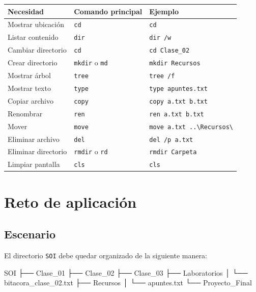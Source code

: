 \documentclass[
  spanish,
  letterpaper,
]{scrbook}
\newenvironment{Shaded}{\begin{snugshade}}{\end{snugshade}}
\newcommand{\NormalTok}[1]{\textcolor[rgb]{0.00,0.23,0.31}{#1}}
\newcounter{none} %
\begin{document}
{\def\LTcaptype{none} %
\begin{longtable}[]{@{}lll@{}}
\toprule\noalign{}
Necesidad & Comando principal & Ejemplo \\
\midrule\noalign{}
\endhead
\bottomrule\noalign{}
\endlastfoot
Mostrar ubicación & \texttt{cd} & \texttt{cd} \\
Listar contenido & \texttt{dir} & \texttt{dir\ /w} \\
Cambiar directorio & \texttt{cd} & \texttt{cd\ Clase\_02} \\
Crear directorio & \texttt{mkdir} o \texttt{md} &
\texttt{mkdir\ Recursos} \\
Mostrar árbol & \texttt{tree} & \texttt{tree\ /f} \\
Mostrar texto & \texttt{type} & \texttt{type\ apuntes.txt} \\
Copiar archivo & \texttt{copy} & \texttt{copy\ a.txt\ b.txt} \\
Renombrar & \texttt{ren} & \texttt{ren\ a.txt\ b.txt} \\
Mover & \texttt{move} &
\texttt{move\ a.txt\ ..\textbackslash{}Recursos\textbackslash{}} \\
Eliminar archivo & \texttt{del} & \texttt{del\ /p\ a.txt} \\
Eliminar directorio & \texttt{rmdir} o \texttt{rd} &
\texttt{rmdir\ Carpeta} \\
Limpiar pantalla & \texttt{cls} & \texttt{cls} \\
\end{longtable}
}


\chapter{Reto de aplicación}\label{reto-de-aplicaciuxf3n}

\section{Escenario}\label{escenario}

El directorio \texttt{SOI} debe quedar organizado de la siguiente
manera:

\begin{Shaded}
\begin{Highlighting}[]
\NormalTok{SOI}
\NormalTok{├── Clase\_01}
\NormalTok{├── Clase\_02}
\NormalTok{├── Clase\_03}
\NormalTok{├── Laboratorios}
\NormalTok{│   └── bitacora\_clase\_02.txt}
\NormalTok{├── Recursos}
\NormalTok{│   └── apuntes.txt}
\NormalTok{└── Proyecto\_Final}
\end{Highlighting}
\end{Shaded}
\end{document}
